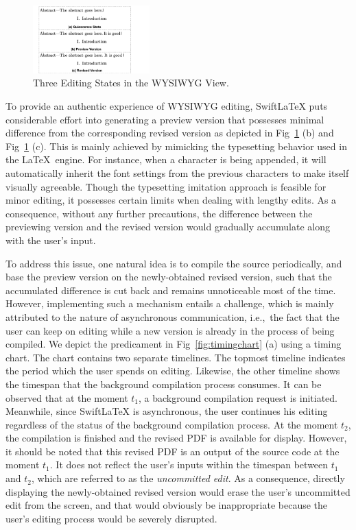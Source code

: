 \documentclass[sigconf]{acmart}
\newcommand{\ie}{i.e.,\ }
\begin{document}
\begin{figure}[t]
\begin{center}
\includegraphics[width=0.40\textwidth]{figure/editing_example}
\caption{Three Editing States in the WYSIWYG View.}
\label{fig:editingexample}
\end{center}
\end{figure}

To provide an authentic experience of WYSIWYG editing, SwiftLaTeX puts considerable effort into generating a preview version that possesses minimal difference from the corresponding revised version as depicted in Fig~\ref{fig:editingexample} (b) and Fig~\ref{fig:editingexample} (c).
This is mainly achieved by mimicking the typesetting behavior used in the \LaTeX\ engine. 
For instance, when a character is being appended, it will automatically inherit the font settings from the previous characters to make itself visually agreeable.
Though the typesetting imitation approach is feasible for minor editing, it possesses certain limits when dealing with lengthy edits.
As a consequence, without any further precautions, the difference between the previewing version and the revised version would gradually accumulate along with the user's input.

To address this issue, one natural idea is to  compile the source periodically, and base the preview version on the newly-obtained revised version, such that the accumulated difference is cut back and remains unnoticeable most of the time. However, implementing such a mechanism entails a challenge, which is mainly attributed to the nature of asynchronous communication, \ie the fact that the user can keep on editing while a new version is already in the process of being compiled. 
We depict the predicament in Fig~\ref{fig:timingchart} (a) using a timing chart.
The chart contains two separate timelines. 
The topmost timeline indicates the period which the user spends on editing.
Likewise, the other timeline shows the timespan that the background compilation process consumes.
It can be observed that at the moment $t_1$, a background compilation request is initiated.
Meanwhile, since SwiftLaTeX is asynchronous, the user continues his editing regardless of the status of the background compilation process.
At the moment $t_2$, the compilation is finished and the revised PDF is available for display.
However, it should be noted that this revised PDF is an output of the source code at the moment $t_1$. 
It does not reflect the user's inputs within the timespan between $t_1$ and $t_2$, which are referred to as the \textit{uncommitted edit}.
As a consequence, directly displaying the newly-obtained revised version would erase the user's uncommitted edit  from the screen, and that would  obviously be inappropriate because the user's editing process would be severely disrupted.
\end{document}

